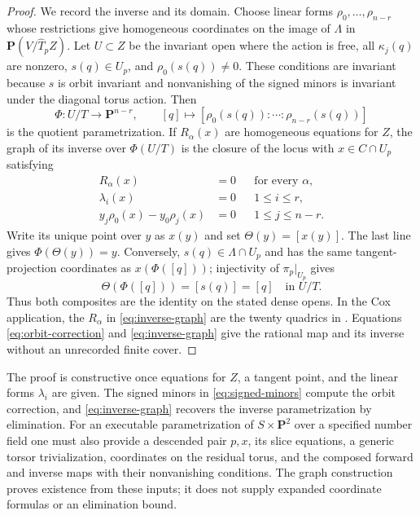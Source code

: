 \documentclass[11pt]{article}
\theoremstyle{remark}
\newcommand{\PP}{\mathbf P}
\begin{document}
\begin{proof}
We record the inverse and its domain.  Choose linear forms
\(\rho_0,\ldots,\rho_{n-r}\) whose restrictions give homogeneous coordinates
on the image of \(\Lambda\) in \(\PP(V/\widehat T_pZ)\).  Let
\(U\subset Z\) be the invariant open where the action is free, all
\(\kappa_j(q)\) are nonzero, \(s(q)\in U_p\), and
\(\rho_0(s(q))\ne0\).  These conditions are invariant because \(s\) is
orbit invariant and nonvanishing of the signed minors is invariant under
the diagonal torus action.  Then
\begin{equation}
 \Phi:U/T\longrightarrow\PP^{n-r},\qquad
 [q]\longmapsto[\rho_0(s(q)):\cdots:\rho_{n-r}(s(q))]
 \label{eq:quotient-map}
\end{equation}
is the quotient parametrization.  If \(R_\alpha(x)\) are homogeneous
equations for \(Z\), the graph of its inverse over \(\Phi(U/T)\) is the
closure of the locus with \(x\in C\cap U_p\) satisfying
\begin{equation}
 \begin{aligned}
 R_\alpha(x)&=0 &&\text{for every }\alpha,\\
 \lambda_i(x)&=0 &&1\leq i\leq r,\\
 y_j\rho_0(x)-y_0\rho_j(x)&=0 &&1\leq j\leq n-r.
 \end{aligned}
 \label{eq:inverse-graph}
\end{equation}
Write its unique point over \(y\) as \(x(y)\) and set
\(\Theta(y)=[x(y)]\).  The last line gives
\(\Phi(\Theta(y))=y\).  Conversely, \(s(q)\in\Lambda\cap U_p\) and has the
same tangent-projection coordinates as \(x(\Phi([q]))\); injectivity of
\(\pi_p|_{U_p}\) gives
\[
 \Theta(\Phi([q]))=[s(q)]=[q]\quad\text{in }U/T.
\]
Thus both composites are the identity on the stated dense opens.  In the
Cox application, the \(R_\alpha\) in \eqref{eq:inverse-graph} are the twenty
quadrics in \cite[Section~3]{TZ}.  Equations \eqref{eq:orbit-correction}
and \eqref{eq:inverse-graph} give the rational map and its inverse without
an unrecorded finite cover.
\end{proof}

The proof is constructive once equations for \(Z\), a tangent point, and the
linear forms \(\lambda_i\) are given.  The signed minors in
\eqref{eq:signed-minors} compute the orbit correction, and
\eqref{eq:inverse-graph} recovers the inverse parametrization by elimination.
For an executable parametrization of \(S\times\PP^2\) over a specified
number field one must also provide a descended pair \(p,x\), its slice
equations, a generic torsor trivialization, coordinates on the residual
torus, and the composed forward and inverse maps with their nonvanishing
conditions.  The graph construction proves existence from these inputs;
it does not supply expanded coordinate formulas or an elimination bound.
\end{document}
